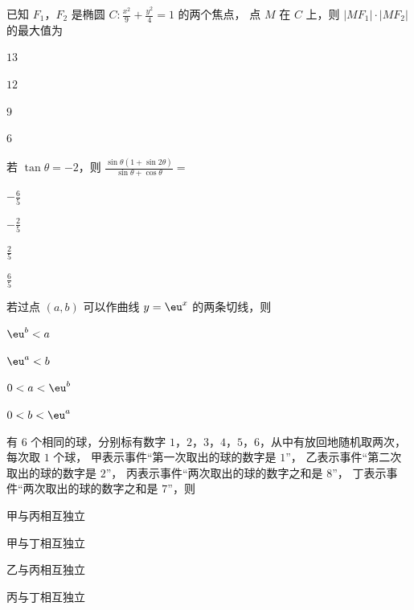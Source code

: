 \documentclass{exam-zh}
\begin{document}
\begin{question}
  已知 $F_1$，$F_2$ 是椭圆 $C \colon \frac{x^2}{9} + \frac{y^2}{4} = 1$ 的两个焦点，
  点 $M$ 在 $C$ 上，则 $|M F_1| \cdot |M F_2|$ 的最大值为 \paren
  \begin{choices}
    \item $13$
    \item $12$
    \item $9$
    \item $6$
  \end{choices}
\end{question}

\begin{question}
  若 $\tan\theta = -2$，则 $\frac{\sin\theta (1 + \sin 2\theta)}{\sin\theta + \cos\theta} = $ \paren
  \begin{choices}
    \item $-\frac{6}{5}$
    \item $-\frac{2}{5}$
    \item $\frac{2}{5}$
    \item $\frac{6}{5}$
  \end{choices}
\end{question}

\begin{question}
  若过点 $(a, b)$ 可以作曲线 $y = \eu^x$ 的两条切线，则 \paren
  \begin{choices}
    \item $\eu^b < a$
    \item $\eu^a < b$
    \item $0 < a < \eu^b$
    \item $0 < b < \eu^a$
  \end{choices}
\end{question}

\begin{question}
  有 $6$ 个相同的球，分别标有数字 $1$，$2$，$3$，$4$，$5$，$6$，从中有放回地随机取两次，每次取 $1$ 个球，
  甲表示事件“第一次取出的球的数字是 $1$”，
  乙表示事件“第二次取出的球的数字是 $2$”，
  丙表示事件“两次取出的球的数字之和是 $8$”，
  丁表示事件“两次取出的球的数字之和是 $7$”，则 \paren
  \begin{choices}
    \item 甲与丙相互独立
    \item 甲与丁相互独立
    \item 乙与丙相互独立
    \item 丙与丁相互独立
  \end{choices}
\end{question}
\end{document}
